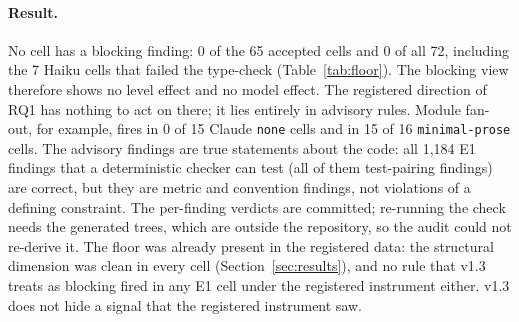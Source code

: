 \documentclass[10pt,a4paper]{article}
\newcommand{\lev}[1]{\texttt{\small #1}}
\begin{document}
\paragraph{Result.} No cell has a blocking finding: 0 of the 65 accepted cells and 0 of all 72, including the 7
Haiku cells that failed the type-check (Table~\ref{tab:floor}). The blocking view therefore shows no level effect and
no model effect. The registered direction of RQ1 has nothing to act on there; it lies entirely in advisory rules. Module
fan-out, for example, fires in 0 of 15 Claude \lev{none} cells and in 15 of 16 \lev{minimal-prose} cells. The
advisory findings are true statements about the code: all 1,184 E1 findings that a deterministic checker can test
(all of them test-pairing findings) are correct, but they are metric and convention findings, not violations of a
defining constraint. The per-finding verdicts are committed; re-running the check needs the generated trees, which
are outside the repository, so the audit could not re-derive it.
The floor was already present in the registered data: the structural dimension was clean in every cell
(Section~\ref{sec:results}), and no rule that v1.3 treats as blocking fired in any E1 cell under the registered
instrument either. v1.3 does not hide a signal that the registered instrument saw.
\end{document}
